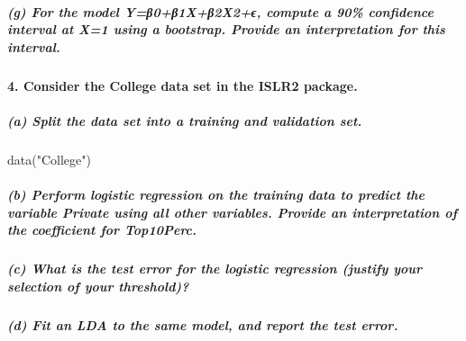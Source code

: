 \documentclass[
]{article}
\newenvironment{Shaded}{\begin{snugshade}}{\end{snugshade}}
\newcommand{\FunctionTok}[1]{\textcolor[rgb]{0.00,0.00,0.00}{#1}}
\newcommand{\NormalTok}[1]{#1}
\newcommand{\StringTok}[1]{\textcolor[rgb]{0.31,0.60,0.02}{#1}}
\begin{document}
\hypertarget{g-for-the-model-yux3b20ux3b21xux3b22x2ux3f5-compute-a-90-confidence-interval-at-x1-using-a-bootstrap.-provide-an-interpretation-for-this-interval.}{%
\subparagraph{(g) For the model Y=β0+β1X+β2X2+ϵ, compute a 90\%
confidence interval at X=1 using a bootstrap. Provide an interpretation
for this
interval.}\label{g-for-the-model-yux3b20ux3b21xux3b22x2ux3f5-compute-a-90-confidence-interval-at-x1-using-a-bootstrap.-provide-an-interpretation-for-this-interval.}}

\hypertarget{consider-the-college-data-set-in-the-islr2-package.}{%
\paragraph{4. Consider the College data set in the ISLR2
package.}\label{consider-the-college-data-set-in-the-islr2-package.}}

\hypertarget{a-split-the-data-set-into-a-training-and-validation-set.}{%
\subparagraph{(a) Split the data set into a training and validation
set.}\label{a-split-the-data-set-into-a-training-and-validation-set.}}

\begin{Shaded}
\begin{Highlighting}[]
\FunctionTok{data}\NormalTok{(}\StringTok{"College"}\NormalTok{)}
\end{Highlighting}
\end{Shaded}

\hypertarget{b-perform-logistic-regression-on-the-training-data-to-predict-the-variable-private-using-all-other-variables.-provide-an-interpretation-of-the-coefficient-for-top10perc.}{%
\subparagraph{(b) Perform logistic regression on the training data to
predict the variable Private using all other variables. Provide an
interpretation of the coefficient for
Top10Perc.}\label{b-perform-logistic-regression-on-the-training-data-to-predict-the-variable-private-using-all-other-variables.-provide-an-interpretation-of-the-coefficient-for-top10perc.}}

\hypertarget{c-what-is-the-test-error-for-the-logistic-regression-justify-your-selection-of-your-threshold}{%
\subparagraph{(c) What is the test error for the logistic regression
(justify your selection of your
threshold)?}\label{c-what-is-the-test-error-for-the-logistic-regression-justify-your-selection-of-your-threshold}}

\hypertarget{d-fit-an-lda-to-the-same-model-and-report-the-test-error.}{%
\subparagraph{(d) Fit an LDA to the same model, and report the test
error.}\label{d-fit-an-lda-to-the-same-model-and-report-the-test-error.}}
\end{document}
